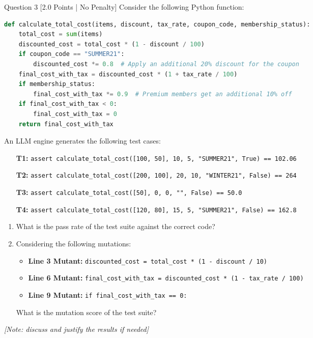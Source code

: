 \documentclass[11pt,a4paper]{article}
\begin{document}
\begin{questionbox}{Question 3 \hfill [2.0 Points | No Penalty]}
Consider the following Python function:

\begin{lstlisting}[language=Python]
def calculate_total_cost(items, discount, tax_rate, coupon_code, membership_status):
    total_cost = sum(items)
    discounted_cost = total_cost * (1 - discount / 100)
    if coupon_code == "SUMMER21":
        discounted_cost *= 0.8  # Apply an additional 20% discount for the coupon
    final_cost_with_tax = discounted_cost * (1 + tax_rate / 100)
    if membership_status:
        final_cost_with_tax *= 0.9  # Premium members get an additional 10% off
    if final_cost_with_tax < 0:
        final_cost_with_tax = 0
    return final_cost_with_tax
\end{lstlisting}

An LLM engine generates the following test cases:
\begin{itemize}[leftmargin=1.5cm]
    \item[\textbf{T1:}] \texttt{assert calculate\_total\_cost([100, 50], 10, 5, "SUMMER21", True) == 102.06}
    \item[\textbf{T2:}] \texttt{assert calculate\_total\_cost([200, 100], 20, 10, "WINTER21", False) == 264}
    \item[\textbf{T3:}] \texttt{assert calculate\_total\_cost([50], 0, 0, "", False) == 50.0}
    \item[\textbf{T4:}] \texttt{assert calculate\_total\_cost([120, 80], 15, 5, "SUMMER21", False) == 162.8}
\end{itemize}

\begin{enumerate}[label=\textbf{\alph*)}]
    \item What is the pass rate of the test suite against the correct code?
    \item Considering the following mutations:
    \begin{itemize}
        \item \textbf{Line 3 Mutant:} \texttt{discounted\_cost = total\_cost * (1 - discount / 10)}
        \item \textbf{Line 6 Mutant:} \texttt{final\_cost\_with\_tax = discounted\_cost * (1 - tax\_rate / 100)}
        \item \textbf{Line 9 Mutant:} \texttt{if final\_cost\_with\_tax == 0:}
    \end{itemize}
    What is the mutation score of the test suite?
\end{enumerate}
\textit{[Note: discuss and justify the results if needed]}
\end{questionbox}
\end{document}
